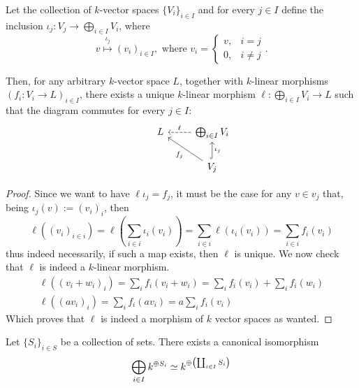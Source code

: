 \begin{proposition}
   Let the collection of \(k\)-vector spaces \(\{V_i\}_{i \in I}\) and for every
   \(j \in I\) define the inclusion \(\iota_j : V_j \to \bigoplus_{i \in I}
   V_i\), where
   \[
      v \overset{\iota_j}\longmapsto (v_i)_{i \in I}, \text{ where } v_i =
      \begin{cases}
         v, &i = j \\
         0, &i \neq j
      \end{cases}.
   \]

   Then, for any arbitrary \(k\)-vector space \(L\), together with \(k\)-linear
   morphisms \((f_i : V_i \to L)_{i \in I}\), there exists a unique \(k\)-linear
   morphism \(\ell : \bigoplus_{i \in I} V_i \to L\) such that the diagram
   commutes for every \(j \in I\):
   \[
      \begin{tikzcd}
         &L &\bigoplus_{i \in I} V_i \ar[l, dashed, swap, "\ell"]  \\
         & &V_j \ar[u, hook, swap, "\iota_j"] \ar[ul, "f_j"]
      \end{tikzcd}
   \]
\end{proposition}

\begin{proof}
   Since we want to have \(\ell  \iota_j = f_j\), it must be the case for
   any \(v \in v_j\) that, being \(\iota_j(v) := (v_i)_i\), then
   \[
      \ell((v_i)_{i \in i}) = \ell \left( \sum_{i \in i} \iota_i(v_i) \right) =
      \sum_{i \in i} \ell(\iota_i(v_i)) = \sum_{i \in i} f_i(v_i)
   \]
   thus indeed necessarily, if such a map exists, then \(\ell\) is unique. We
   now check that \(\ell\) is indeed a \(k\)-linear morphism.
   \begin{gather*}
     \ell\left( (v_i + w_i)_i \right) = \sum_i f_i(v_i + w_i) = \sum_i f_i(v_i)
     + \sum_i  f_i(w_i) \\
     \ell((av_i)_i) = \sum_i f_i(av_i) = a \sum_i f_i(v_i)
   \end{gather*}
   Which proves that \(\ell\) is indeed a morphism of \(k\) vector spaces as
   wanted.
\end{proof}

\begin{proposition}
  Let \(\{S_i\}_{i \in S}\) be a collection of sets. There exists a canonical
  isomorphism
  \[
    \bigoplus_{i \in I} k^{\oplus S_i} \simeq k^{\oplus \left( \coprod_{i \in I}
    S_i \right)}
  \]
\end{proposition}

